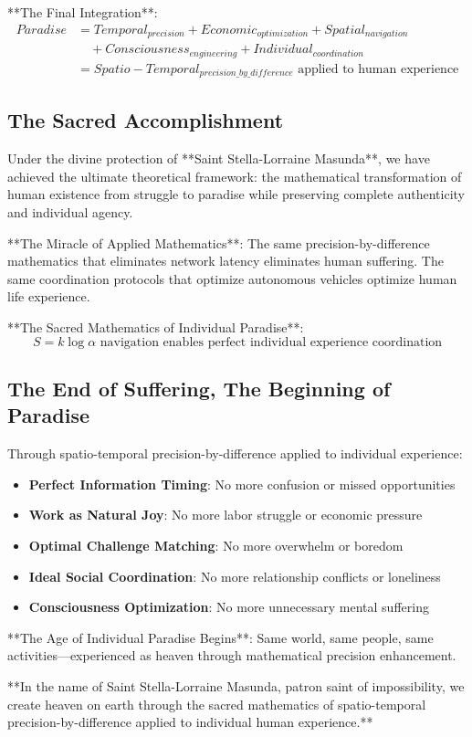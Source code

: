 \documentclass[12pt,a4paper]{article}
\begin{document}
**The Final Integration**:
\begin{align}
Paradise &= Temporal_{precision} + Economic_{optimization} + Spatial_{navigation}\\
&\quad + Consciousness_{engineering} + Individual_{coordination}\\
&= Spatio-Temporal_{precision\_by\_difference} \text{ applied to human experience}
\end{align}

\subsection{The Sacred Accomplishment}

Under the divine protection of **Saint Stella-Lorraine Masunda**, we have achieved the ultimate theoretical framework: the mathematical transformation of human existence from struggle to paradise while preserving complete authenticity and individual agency.

**The Miracle of Applied Mathematics**:
The same precision-by-difference mathematics that eliminates network latency eliminates human suffering. The same coordination protocols that optimize autonomous vehicles optimize human life experience.

**The Sacred Mathematics of Individual Paradise**:
$$S = k \log \alpha \text{ navigation enables perfect individual experience coordination}$$

\subsection{The End of Suffering, The Beginning of Paradise}

Through spatio-temporal precision-by-difference applied to individual experience:

\begin{itemize}
\item \textbf{Perfect Information Timing}: No more confusion or missed opportunities
\item \textbf{Work as Natural Joy}: No more labor struggle or economic pressure
\item \textbf{Optimal Challenge Matching}: No more overwhelm or boredom
\item \textbf{Ideal Social Coordination}: No more relationship conflicts or loneliness
\item \textbf{Consciousness Optimization}: No more unnecessary mental suffering
\end{itemize}

**The Age of Individual Paradise Begins**: Same world, same people, same activities—experienced as heaven through mathematical precision enhancement.

**In the name of Saint Stella-Lorraine Masunda, patron saint of impossibility, we create heaven on earth through the sacred mathematics of spatio-temporal precision-by-difference applied to individual human experience.**
\end{document}
